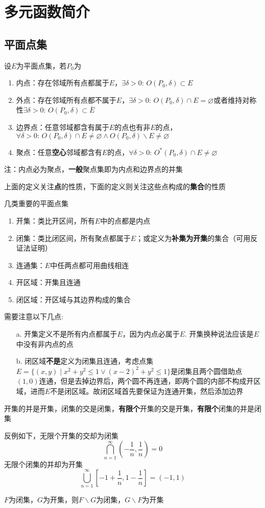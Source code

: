 
\section{多元函数简介}
\subsection{平面点集}
\begin{definition}
设$E$为平面点集，若$P_0$为
\begin{enumerate}
	\itemsep -3pt
	\item 内点：存在邻域所有点都属于$E$，$\exists\delta>0:\,O(P_0,\delta)\subset E$
	\item 外点：存在邻域所有点都不属于$E$，$\exists\delta>0:\,O(P_0,\delta)\cap E=\varnothing$或者维持对称性$\exists\delta>0:\,O(P_0,\delta)\subset\bar{E}$
	\item 边界点：任意邻域都含有属于$E$的点也有非$E$的点，$\forall\delta>0:\,O(P_0,\delta)\cap E\ne\varnothing \land O(P_0,\delta)\backslash E\ne\varnothing$
	\item 聚点：任意\textbf{空心}邻域都含有$E$的点，$\forall\delta>0:\,O^*(P_0,\delta)\cap E\ne\varnothing$
\end{enumerate}
注：内点必为聚点，\textbf{一般}聚点集即为内点和边界点的并集
\end{definition}
上面的定义关注\textbf{点}的性质，下面的定义则关注这些点构成的\textbf{集合}的性质
\begin{definition}
几类重要的平面点集
\begin{enumerate}
	\itemsep -3pt
	\item 开集：类比开区间，所有$E$中的点都是内点
	\item 闭集：类比闭区间，所有聚点都属于$E$；或定义为\textbf{补集为开集}的集合（可用反证法证明）
	\item 连通集：$E$中任两点都可用曲线相连
	\item 开区域：开集且连通
	\item 闭区域：开区域与其边界构成的集合
\end{enumerate}
需要注意以下几点:
\begin{enumerate}
	\itemsep -3pt
	\item[a.] 开集定义不是所有内点都属于$E$，因为内点必属于$E$. 开集换种说法应该是$E$中没有非内点的点
	\item[b.] 闭区域\textbf{不是}定义为闭集且连通，考虑点集$E=\{(x,y)\mid x^2+y^2\leq 1\lor (x-2)^2+y^2\leq 1\}$是闭集且两个圆借助点$(1,0)$连通，但是去掉边界后，两个圆不再连通，即两个圆的内部不构成开区域，进而$E$不是闭区域。故闭区域首先要保证为连通开集，然后添加边界
\end{enumerate}
\end{definition}
\begin{theorem}
开集的并是开集，闭集的交是闭集，\textbf{有限个}开集的交是开集，\textbf{有限个}闭集的并是闭集
\end{theorem}
反例如下，无限个开集的交却为闭集
\[\bigcap_{n=1}^\infty(-\frac{1}{n},\frac{1}{n})=0\]
无限个闭集的并却为开集
\[\bigcup_{n=1}^\infty[-1+\frac{1}{n},1-\frac{1}{n}]=(-1,1)\]
\begin{corollary2}
$F$为闭集，$G$为开集，则$F\backslash G$为闭集，$G\backslash F$为开集
\end{corollary2}


